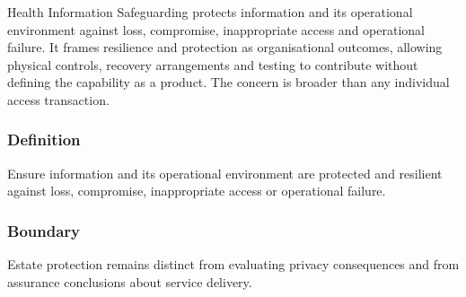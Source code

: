 Health Information Safeguarding protects information and its operational environment against loss, compromise, inappropriate access and operational failure. It frames resilience and protection as organisational outcomes, allowing physical controls, recovery arrangements and testing to contribute without defining the capability as a product. The concern is broader than any individual access transaction.

\subsubsection*{Definition}

Ensure information and its operational environment are protected and resilient against loss, compromise, inappropriate access or operational failure.

\subsubsection*{Boundary}

Estate protection remains distinct from evaluating privacy consequences and from assurance conclusions about service delivery.

